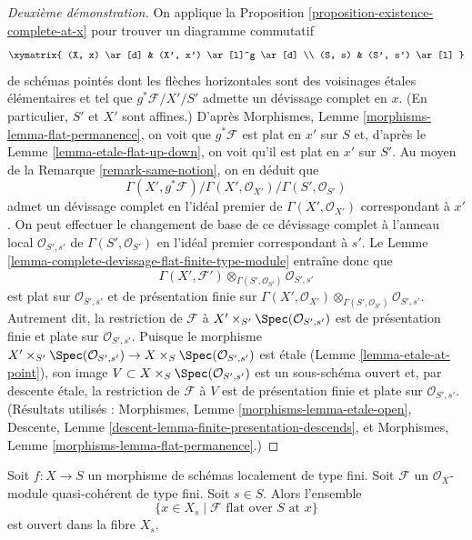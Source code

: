 \begin{proof}[Deuxième démonstration]
On applique la
Proposition \ref{proposition-existence-complete-at-x}
pour trouver un diagramme commutatif
$$
\xymatrix{
(X, x) \ar[d] & (X', x') \ar[l]^g \ar[d] \\
(S, s) & (S', s') \ar[l]
}
$$
de schémas pointés dont les flèches
horizontales sont des voisinages \'etales élémentaires
et tel que $g^*\mathcal{F}/X'/S'$ admette un
d\'evissage complet en $x$.
(En particulier, $S'$ et $X'$ sont affines.) D'après
Morphismes, Lemme \ref{morphisms-lemma-flat-permanence},
on voit que $g^*\mathcal{F}$ est plat en $x'$ sur $S$ et, d'après le
Lemme \ref{lemma-etale-flat-up-down},
on voit qu'il est plat en $x'$ sur $S'$. Au moyen de la
Remarque \ref{remark-same-notion},
on en déduit que
$$
\Gamma(X', g^*\mathcal{F})/
\Gamma(X', \mathcal{O}_{X'})/
\Gamma(S', \mathcal{O}_{S'})
$$
admet un d\'evissage complet en l'idéal premier de $\Gamma(X', \mathcal{O}_{X'})$
correspondant à $x'$. On peut effectuer le changement de base de ce
d\'evissage complet à l'anneau local $\mathcal{O}_{S', s'}$
de $\Gamma(S', \mathcal{O}_{S'})$ en l'idéal premier correspondant à
$s'$. Le
Lemme \ref{lemma-complete-devissage-flat-finite-type-module}
entraîne donc que
$$
\Gamma(X', \mathcal{F}')
\otimes_{\Gamma(S', \mathcal{O}_{S'})}
\mathcal{O}_{S', s'}
$$
est plat sur $\mathcal{O}_{S', s'}$ et de présentation finie sur
$\Gamma(X', \mathcal{O}_{X'})
\otimes_{\Gamma(S', \mathcal{O}_{S'})} \mathcal{O}_{S', s'}$.
Autrement dit, la restriction de $\mathcal{F}$ à
$X' \times_{S'} \Spec(\mathcal{O}_{S', s'})$
est de présentation finie et plate sur $\mathcal{O}_{S', s'}$.
Puisque le morphisme
$X' \times_{S'} \Spec(\mathcal{O}_{S', s'})
\to X \times_S \Spec(\mathcal{O}_{S', s'})$
est \'etale
(Lemme \ref{lemma-etale-at-point}),
son image $V \subset X \times_S \Spec(\mathcal{O}_{S', s'})$
est un sous-schéma ouvert et, par descente \'etale, la restriction
de $\mathcal{F}$ à $V$ est de présentation finie et plate sur
$\mathcal{O}_{S', s'}$. (Résultats utilisés :
Morphismes, Lemme \ref{morphisms-lemma-etale-open},
Descente, Lemme \ref{descent-lemma-finite-presentation-descends}, et
Morphismes, Lemme \ref{morphisms-lemma-flat-permanence}.)
\end{proof}

\begin{lemma}
\label{lemma-open-in-fibre-where-flat}
Soit $f : X \to S$ un morphisme de schémas localement de type fini.
Soit $\mathcal{F}$ un $\mathcal{O}_X$-module quasi-cohérent de type fini.
Soit $s \in S$. Alors l'ensemble
$$
\{x \in X_s \mid \mathcal{F} \text{ flat over }S\text{ at }x\}
$$
est ouvert dans la fibre $X_s$.
\end{lemma}

